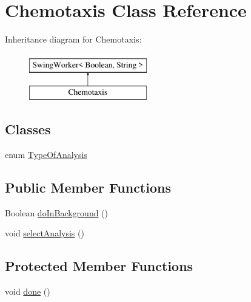 \hypertarget{classanalysis_1_1_chemotaxis}{}\section{Chemotaxis Class Reference}
\label{classanalysis_1_1_chemotaxis}
Inheritance diagram for Chemotaxis\+:\begin{figure}[H]
\begin{center}
\leavevmode
\includegraphics[height=2.000000cm]{classanalysis_1_1_chemotaxis}
\end{center}
\end{figure}
\subsection*{Classes}
\begin{DoxyCompactItemize}
\item 
enum \hyperlink{enumanalysis_1_1_chemotaxis_1_1_type_of_analysis}{Type\+Of\+Analysis}
\end{DoxyCompactItemize}
\subsection*{Public Member Functions}
\begin{DoxyCompactItemize}
\item 
Boolean \hyperlink{classanalysis_1_1_chemotaxis_ab048bf7b5ce8c46bb48b99b8d0999110}{do\+In\+Background} ()
\item 
void \hyperlink{classanalysis_1_1_chemotaxis_aef66a58ab7f95817a68a3429550562fc}{select\+Analysis} ()
\end{DoxyCompactItemize}
\subsection*{Protected Member Functions}
\begin{DoxyCompactItemize}
\item 
void \hyperlink{classanalysis_1_1_chemotaxis_ab650651e4cda2869f73100c6fd2c821a}{done} ()
\end{DoxyCompactItemize}
